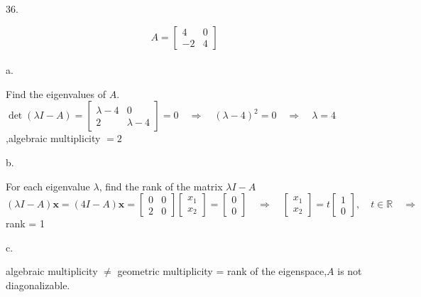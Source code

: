 \documentclass[12pt]{book}
\begin{document}
\begin{CJK}{UTF8}{bsmi}
36. \begin{minipage}[t]{\dimexpr\linewidth}
\[ A=
\begin{bmatrix}
4  & 0 \\
-2 & 4 
\end{bmatrix}
\]\\[-25pt]
a. \begin{minipage}[t]{\dimexpr\linewidth}
Find the eigenvalues of $A$. \\
$\det(\lambda I-A)=\begin{bmatrix}
\lambda-4  & 0 \\
2 & \lambda-4 
\end{bmatrix}=0\quad\Rightarrow\quad(\lambda-4)^2=0\quad\Rightarrow\quad\lambda=4$,\quad algebraic multiplicity $=2$ \\
\end{minipage}
b. \begin{minipage}[t]{\dimexpr\linewidth}
For each eigenvalue $\lambda$, find the rank of the matrix $\lambda I-A$\\
$(\lambda I-A)\textbf{x}=(4I-A)\textbf{x}=\begin{bmatrix}
0 & 0 \\
2 & 0
\end{bmatrix}\begin{bmatrix}
x_1 \\ x_2
\end{bmatrix}=\begin{bmatrix}
0 \\ 0
\end{bmatrix}\quad\Rightarrow\quad\begin{bmatrix}
x_1 \\ x_2
\end{bmatrix}=t\begin{bmatrix}
1 \\ 0
\end{bmatrix},\quad t\in\mathbb{R}\quad\Rightarrow\quad$
rank = 1 \\
\end{minipage}
c. \begin{minipage}[t]{\dimexpr\linewidth}
algebraic multiplicity $\ne$ geometric multiplicity = rank of the eigenspace,\quad $A$ is not diagonalizable.
\end{minipage}
\end{minipage} \\


\end{CJK}
\end{document}
